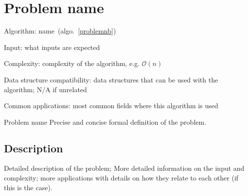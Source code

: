 \documentclass{article}
\begin{document}
\fi

%
%

\def\pbname{Problem name} %

\section{\pbname} 

\begin{overview}
\item [Algorithm:] name~(algo.~\ref{problemnb}) 
\item [Input:] what inputs are expected
\item [Complexity:] complexity of the algorithm, e.g. $\mathcal{O}(n)$
\item [Data structure compatibility:] data structures that can be used with the algorithm; N/A if unrelated
\item [Common applications:] most common fields where this algorithm is used
\end{overview}



\begin{problem}{\pbname}
	Precise and concise formal definition of the problem.
\end{problem}

\subsection*{Description}
Detailed description of the problem; More detailed information on the input and complexity; more applications with details on how they relate to each other (if this is the case).

\begin{Algorithm}[name\label{problemnb}]
	\Input{}
	\Output{}
	\BlankLine

	\Ret

\end{Algorithm}
\end{document}
